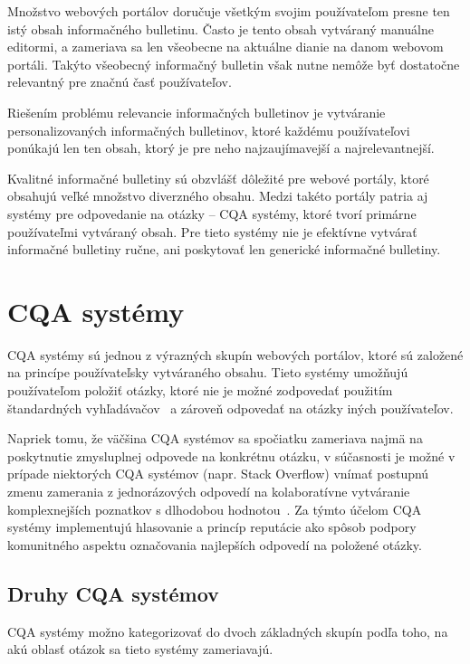 Množstvo webových portálov doručuje všetkým svojim používateľom presne ten istý obsah informačného bulletinu.
Často je tento obsah vytváraný manuálne editormi, a zameriava sa len všeobecne na aktuálne dianie na danom webovom
portáli. Takýto všeobecný informačný bulletin však nutne nemôže byť dostatočne relevantný pre značnú časť používateľov.

Riešením problému relevancie informačných bulletinov je vytváranie personalizovaných informačných bulletinov, ktoré
každému používateľovi ponúkajú len ten obsah, ktorý je pre neho najzaujímavejší a najrelevantnejší.

Kvalitné informačné bulletiny sú obzvlášť dôležité pre webové portály, ktoré obsahujú veľké množstvo diverzného obsahu.
Medzi takéto portály patria aj systémy pre odpovedanie na otázky -- CQA systémy, ktoré tvorí primárne používateľmi
vytváraný obsah. Pre tieto systémy nie je efektívne vytvárať informačné bulletiny ručne, ani poskytovať len generické
informačné bulletiny.




\newpage
\chapter{CQA systémy}

CQA systémy sú jednou z výrazných skupín webových portálov, ktoré sú založené na princípe používateľsky vytváraného obsahu.
Tieto systémy umožňujú používateľom položiť otázky, ktoré nie je možné zodpovedať použitím štandardných vyhľadávačov~\cite{Liu2012}
a zároveň odpovedať na otázky iných používateľov.

Napriek tomu, že väčšina CQA systémov sa spočiatku zameriava najmä na poskytnutie zmysluplnej odpovede na konkrétnu otázku,
v súčasnosti je možné v prípade niektorých CQA systémov (napr. Stack Overflow) vnímať postupnú zmenu zamerania
z jednorázových odpovedí na kolaboratívne vytváranie komplexnejších poznatkov s dlhodobou hodnotou~\cite{Anderson2012}.
Za týmto účelom CQA systémy implementujú hlasovanie a princíp reputácie ako spôsob podpory komunitného aspektu označovania
najlepších odpovedí na položené otázky.


\section{Druhy CQA systémov}

CQA systémy možno kategorizovať do dvoch základných skupín podľa toho, na akú oblasť otázok sa tieto systémy zameriavajú.

